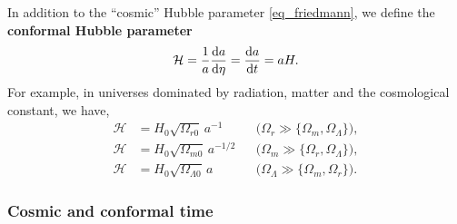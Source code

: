 \documentclass[10pt,a4paper]{article}
\begin{document}
In addition to the ``cosmic'' Hubble parameter \eqref{eq_friedmann},
we define the \textbf{conformal Hubble parameter}
\begin{equation}
	\mathcal{H} = \frac1a \odv{a}{\eta} = \odv{a}{t} = a H.
\label{eq_conformal_hubble}
\end{equation}
For example, in universes dominated by radiation, matter and the cosmological constant,
we have,
\begin{subequations}
\begin{align}
	\mathcal{H} &= H_0 \sqrt{\Omega_{r0}} \, a^{-1} && \Big( \Omega_r \gg \{\Omega_m,\Omega_\Lambda\} \Big), \label{eq_conformal_hubble_dominated_radiation} \\
	\mathcal{H} &= H_0 \sqrt{\Omega_{m0}} \, a^{-1/2} && \Big( \Omega_m \gg \{\Omega_r,\Omega_\Lambda\} \Big), \\
	\mathcal{H} &= H_0 \sqrt{\Omega_{\Lambda0}} \, a && \Big( \Omega_\Lambda \gg \{\Omega_m,\Omega_r\} \Big).
\end{align}
\label{eq_conformal_hubble_dominated}
\end{subequations}
\iffalse
\begin{equation}
	\mathcal{H} = \Bigg\{
		H_0 \sqrt{\Omega_{r0}} a^{-1}, \,\,
		H_0 \sqrt{\Omega_{m0}} a^{-1/2}, \,\,
		H_0 \sqrt{\Omega_{\Lambda0}} a
	\Bigg\}
\label{eq_conformal_hubble_dominated}
\end{equation}
\fi
\iffalse
\begin{equation}
\begin{aligned}
	\mathcal{H} &= H_0 \sqrt{\Omega_{r0}} e^{-x}, &
	\frac{\mathcal{H}'}{\mathcal{H}} &= -1, &
	\frac{\mathcal{H}''}{\mathcal{H}} &= 1 & \Big(\Omega_r \gg \{\Omega_m,\Omega_\Lambda\}\Big) \\
	\mathcal{H} &= H_0 \sqrt{\Omega_{r0}} e^{-\frac12x}, &
	\frac{\mathcal{H}'}{\mathcal{H}} &= -\frac12 &
	\frac{\mathcal{H}''}{\mathcal{H}} &= \frac14 & \Big(\Omega_m \gg \{\Omega_r,\Omega_\Lambda\}\Big) \\
	\mathcal{H} &= H_0 \sqrt{\Omega_{r0}} e^{+x}, &
	\frac{\mathcal{H}'}{\mathcal{H}} &= +1, &
	\frac{\mathcal{H}''}{\mathcal{H}} &= 1 & \Big(\Omega_\Lambda \gg \{\Omega_r,\Omega_m\}\Big).\\
\end{aligned}
\label{eq_conformal_hubble_dominated}
\end{equation}
\fi

\subsubsection{Cosmic and conformal time}
\end{document}
